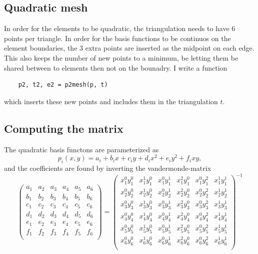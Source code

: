 \documentclass[aps, 12pt]{revtex4}
\begin{document}
\subsection{Quadratic mesh}
In order for the elements to be quadratic, the triangulation needs to have 6 points per triangle. In order for the basis functions to be continuos on the element boundaries, the 3 extra points are inserted as the midpoint on each edge. This also keeps the number of new points to a minimum, be letting them be shared between to elements then not on the bounadry. I write a function
\begin{verbatim}
    p2, t2, e2 = p2mesh(p, t)
\end{verbatim}
which inserts these new points and includes them in the triangulation $t$.

\subsection{Computing the matrix}
The quadratic basis functons are parameterized as
\begin{equation*}
    p_i(x,y)=a_i+b_ix+c_iy+d_ix^2+e_iy^2+f_ixy,
\end{equation*}
and the coefficients are found by inverting the vandermonde-matrix
\begin{equation*}
    \begin{pmatrix}
        a_1 & a_2 & a_3 & a_4 & a_5 & a_6 \\
        b_1 & b_2 & b_3 & b_4 & b_5 & b_6 \\
        c_1 & c_2 & c_3 & c_4 & c_5 & c_6 \\
        d_1 & d_2 & d_3 & d_4 & d_5 & d_6 \\
        e_1 & e_2 & e_3 & e_4 & e_5 & e_6 \\
        f_1 & f_2 & f_3 & f_4 & f_5 & f_6 \\
    \end{pmatrix} = \begin{pmatrix}
        x_1^0y_1^0 & x_1^1y_1^0 & x_1^0y_1^1 & x_1^2y_1^0 & x_1^0y_1^2 & x_1^1y_1^1 \\
        x_2^0y_2^0 & x_2^1y_2^0 & x_2^0y_2^1 & x_2^2y_2^0 & x_2^0y_2^2 & x_2^1y_2^1 \\
        x_3^0y_3^0 & x_3^1y_3^0 & x_3^0y_3^1 & x_3^2y_3^0 & x_3^0y_3^2 & x_3^1y_3^1 \\
        x_4^0y_4^0 & x_4^1y_4^0 & x_4^0y_4^1 & x_4^2y_4^0 & x_4^0y_4^2 & x_4^1y_4^1 \\
        x_5^0y_5^0 & x_5^1y_5^0 & x_5^0y_5^1 & x_5^2y_5^0 & x_5^0y_5^2 & x_5^1y_5^1 \\
        x_6^0y_6^0 & x_6^1y_6^0 & x_6^0y_6^1 & x_6^2y_6^0 & x_6^0y_6^2 & x_6^1y_6^1 \\
    \end{pmatrix}^{-1}
\end{equation*}
\end{document}
